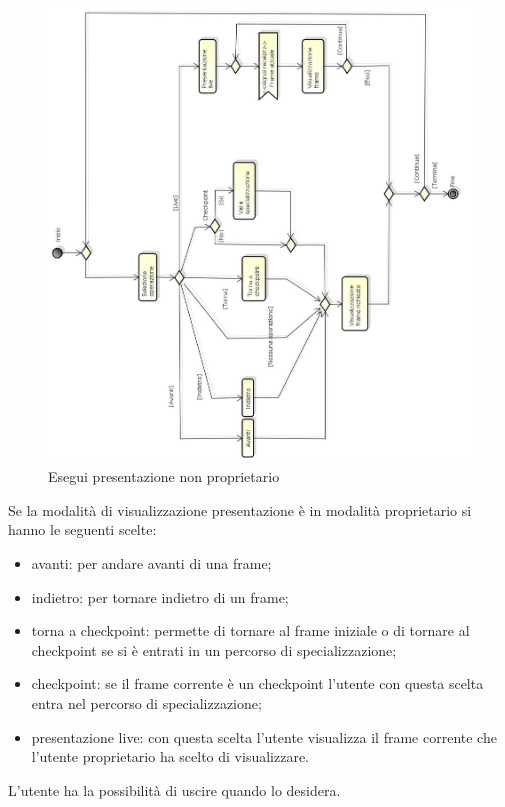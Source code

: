 \begin{figure}[h!]
		\centering
		\includegraphics[scale=.2]{img/Esegui_presentazione_non_proprietario.jpg}
		\caption{Esegui presentazione non proprietario}
		\label{fig:ModelloSpy}
\end{figure}

Se la modalità di visualizzazione presentazione è in modalità proprietario si hanno le seguenti scelte: 
\begin{itemize}
\item
avanti: per andare avanti di una frame; 
\item 
indietro: per tornare indietro di un frame;
\item torna a checkpoint: permette di tornare al frame iniziale o di tornare al checkpoint se si è entrati in un percorso di specializzazione; 
\item checkpoint: se il frame corrente è un checkpoint l'utente con questa scelta entra nel percorso di specializzazione;
\item presentazione live: con questa scelta l'utente visualizza il frame corrente che l'utente proprietario ha scelto di visualizzare.
\end{itemize}
L'utente ha la possibilità di uscire quando lo desidera.

